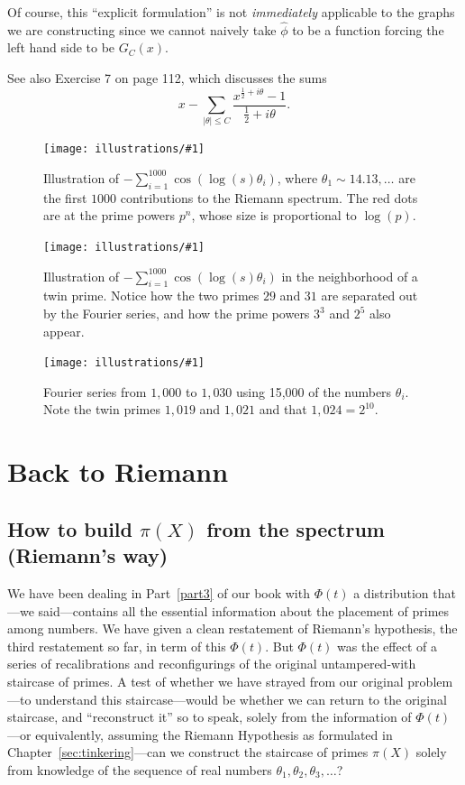 \documentclass[openany]{book}
\newcommand{\ill}[3]{%
   \begin{figure}[H]%
   \vspace{-2ex}
   \centering%
   \texttt{[image: illustrations/\#1]}%
   \caption{#3}%
   \vspace{-2ex}
    \end{figure}}
\theoremstyle{plain}
\theoremstyle{definition}
\newcommand{\RH}{Riemann Hypothesis\index{Riemann Hypothesis}}
\begin{document}
{{{Of course, this ``explicit formulation'' is not {\it immediately}
applicable to the graphs we are constructing since we cannot naively
take ${\hat \phi}$ to be a function forcing the left hand side to be
$G_C(x)$.

   See also Exercise 7 on page 112,  which discusses the sums
$$
x - \sum_{|\theta| \le C} {\frac{x^{{\frac{1}{2}} +i\theta}-1}{{\frac{1}{2}} +i\theta}}.
$$}


 \ill{phi_cos_sum_2_30_1000}{.8}{Illustration of $-\sum_{i=1}^{1000}
   \cos(\log(s)\theta_i)$, where $\theta_1 \sim 14.13, \ldots$ are the
   first $1000$ contributions to the Riemann spectrum\index{Riemann spectrum}.  The red dots
   are at the prime powers $p^n$, whose size is proportional to
   $\log(p)$.}

 \ill{phi_cos_sum_26_34_1000}{.8}{Illustration of $-\sum_{i=1}^{1000}
   \cos(\log(s)\theta_i)$ in the neighborhood of a twin prime.  Notice
   how the two primes $29$ and $31$ are separated out by the Fourier
   series, and how the prime powers $3^3$ and $2^5$ also appear.}

 \ill{phi_cos_sum_1010_1026_15000}{.7}{Fourier series from $1,000$ to
   $1,030$ using 15,000 of the numbers $\theta_i$.  Note the twin
   primes $1{,}019$ and $1{,}021$ and that $1{,}024=2^{10}$.}


\part{Back to Riemann\label{part4}}


\chapter[Building $\pi(X)$ from the spectrum]{How to build $\pi(X)$ from the spectrum (Riemann's way)}
  We have been dealing in Part~\ref{part3} of our book with $\Phi(t)$ a
  distribution that---we said---contains all the essential information
  about the placement of primes among numbers. We have given a clean
  restatement of Riemann's hypothesis, the third restatement so far,
  in term of this $\Phi(t)$.  But $\Phi(t)$ was the effect of a series
  of recalibrations and reconfigurings of the original untampered-with
  staircase of primes.  A test of whether we have strayed from our
  original problem---to understand this staircase---would be whether
  we can return to the original staircase, and ``reconstruct it'' so to
  speak, solely from the information of $\Phi(t)$---or equivalently,
  assuming the \RH{} as formulated in Chapter~\ref{sec:tinkering}---can
  we construct the staircase of primes $\pi(X)$ solely
  from knowledge of the sequence of real numbers $\theta_1,
  \theta_2,\theta_3,\dots$?




}}
\end{document}
